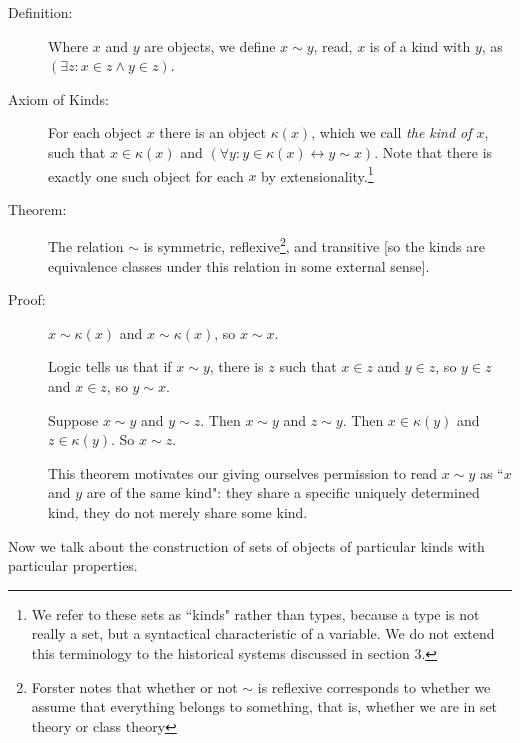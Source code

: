 \documentclass[12pt]{article}
\begin{document}
\begin{description}

\item[Definition:]  Where $x$ and $y$ are objects, we define $x \sim y$, read, $x$ is of a kind with $y$, as $(\exists z:x \in z \wedge y \in z)$.

\item[Axiom of Kinds:]  For each object $x$ there is an object $\kappa(x)$, which we call {\em the kind of $x$}, such that $x \in \kappa(x)$ and $(\forall y:y \in \kappa(x) \leftrightarrow y \sim x)$.  Note that there is exactly one such object for each $x$ by extensionality.\footnote{We refer to these sets as ``kinds" rather than types, because a type is not really a set, but a syntactical characteristic of a variable.  We do not extend this terminology to the historical systems discussed in section 3.}

\item[Theorem:]  The relation $\sim$ is symmetric, reflexive\footnote{Forster notes that whether or not $\sim$ is reflexive corresponds to whether we assume that everything belongs to something, that is, whether we are in set theory or class theory}, and transitive [so the kinds are equivalence classes under this relation in some external sense].

\item[Proof:]  $x \sim \kappa(x)$ and $x \sim \kappa(x)$, so $x \sim x$.

Logic tells us that if $x \sim y$, there is $z$ such that $x \in z$ and $y \in z$, so $y \in z$ and $x \in z$, so $y \sim x$.

Suppose $x \sim y$ and $y \sim z$.  Then $x \sim y$ and $z \sim y$.  Then $x \in \kappa(y)$ and $z \in \kappa(y)$.  So $x \sim z$.

This theorem motivates our giving ourselves permission to read $x \sim y$ as ``$x$ and $y$ are of the same kind":  they share a specific uniquely determined kind, they do not merely share some kind.

\end{description}

Now we talk about the construction of sets of objects of particular kinds with particular properties.
\end{document}
